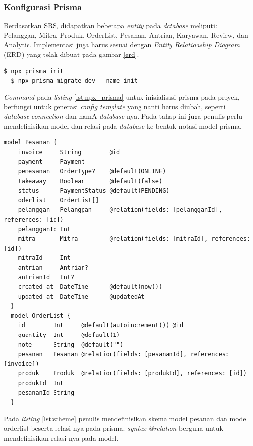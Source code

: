 \subsubsection{Konfigurasi Prisma}
Berdasarkan SRS, didapatkan beberapa \textit{entity} pada \textit{database} meliputi: Pelanggan, Mitra, Produk, OrderList, Pesanan, Antrian, Karyawan, Review, dan Analytic. Implementasi juga harus sesuai dengan \textit{Entity Relationship Diagram} (ERD) yang telah dibuat pada gambar \ref{erd}.
\begin{lstlisting}[caption={terminal: npx},label={lst:npx_prisma}]
  $ npx prisma init
  $ npx prisma migrate dev --name init
\end{lstlisting}
\textit{Command} pada \textit{listing} \ref{lst:npx_prisma} untuk inisialisasi prisma pada proyek, berfungsi untuk generasi\textit{ config template} yang nanti harus diubah, seperti \textit{database} \textit{connection} dan namA \textit{database} nya.
Pada tahap ini juga penulis perlu mendefinisikan model dan relasi pada \textit{database} ke bentuk notasi model prisma.
\begin{lstlisting}[caption={scheme.prisma},label={lst:scheme}]
  model Pesanan {
    invoice     String        @id
    payment     Payment
    pemesanan   OrderType?    @default(ONLINE)
    takeaway    Boolean       @default(false)
    status      PaymentStatus @default(PENDING)
    oderlist    OrderList[]
    pelanggan   Pelanggan     @relation(fields: [pelangganId], references: [id])
    pelangganId Int
    mitra       Mitra         @relation(fields: [mitraId], references: [id])
    mitraId     Int
    antrian     Antrian?
    antrianId   Int?
    created_at  DateTime      @default(now())
    updated_at  DateTime      @updatedAt
  }
  model OrderList {
    id        Int     @default(autoincrement()) @id
    quantity  Int     @default(1)
    note      String  @default("")
    pesanan   Pesanan @relation(fields: [pesananId], references: [invoice])
    produk    Produk  @relation(fields: [produkId], references: [id])
    produkId  Int
    pesananId String
  }
\end{lstlisting}
Pada \textit{listing} \ref{lst:scheme} penulis mendefinisikan skema model pesanan dan model orderlist beserta relasi nya pada prisma. \textit{syntax} \textit{@relation} berguna untuk mendefinisikan relasi nya pada model.

